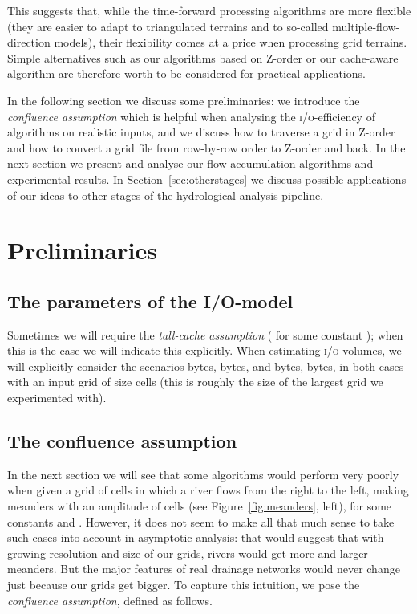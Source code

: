 \documentclass[10pt,a4paper]{article}
\def\io{\textsc{i/o}\xspace}
\begin{document}
This suggests that, while the time-forward processing algorithms are more flexible (they are easier to adapt to triangulated terrains and to so-called multiple-flow-direction models), their flexibility comes at a price when processing grid terrains. Simple alternatives such as our algorithms based on Z-order or our cache-aware algorithm are therefore worth to be considered for practical applications.

In the following section we discuss some preliminaries: we introduce the \emph{confluence assumption} which is helpful when analysing the \io-efficiency of algorithms on realistic inputs, and we discuss how to traverse a grid in Z-order and how to convert a grid file from row-by-row order to Z-order and back. In the next section we present and analyse our flow accumulation algorithms and experimental results.
In Section~\ref{sec:otherstages} we discuss possible applications of our ideas to other stages of the hydrological analysis pipeline.

\section{Preliminaries}

\subsection{The parameters of the I/O-model}
\label{sec:parameters}
Sometimes we will require the \emph{tall-cache assumption} ( for some constant ); when this is the case we will indicate this explicitly.
When estimating \io-volumes, we will explicitly consider the scenarios  bytes,  bytes, and  bytes,  bytes, in both cases with an input grid of size  cells (this is roughly the size of the largest grid we experimented with).

\subsection{The confluence assumption}\label{sec:confluence}
In the next section we will see that some algorithms would perform very poorly when given a grid of  cells in which a river flows from the right to the left, making  meanders with an amplitude of  cells (see Figure~\ref{fig:meanders}, left), for some constants  and . However, it does not seem to make all that much sense to take such cases into account in asymptotic analysis: that would suggest that with growing resolution and size of our grids, rivers would get more and larger meanders. But the major features of real drainage networks would never change just because our grids get bigger. To capture this intuition, we pose the \emph{confluence assumption}, defined as follows.
\end{document}
